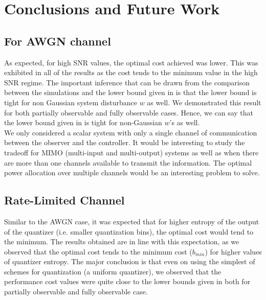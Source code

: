\documentclass[12pt]{caltech_thesis_finalreport}
\begin{document}
\chapter{Conclusions and Future Work}
\section{For AWGN channel}
As expected, for high SNR values, the optimal cost achieved was lower. This was exhibited in all of the results as the cost tends to the minimum value in the high SNR regime.  The important inference that can be drawn from the comparison between the simulations and the lower bound given in \cite{victoria} is that the lower bound is tight for non Gaussian system disturbance $w$ as well. We demonstrated this result for both partially observable and fully observable cases. Hence, we can say that the lower bound given in \cite{victoria} is tight for non-Gaussian $w$'s as well. \\
We only considered a scalar system with only a single channel of communication between the observer and the controller. It would be interesting to study the tradeoff for MIMO (multi-input and multi-output) systems as well as when there are more than one channels available to transmit the information. The optimal power allocation over multiple channels would be an interesting problem to solve. 

\section{Rate-Limited Channel}
Similar to the AWGN case, it was expected that for higher entropy of the output of the quantizer (i.e. smaller quantization bins), the optimal cost would tend to the minimum. The results obtained are in line with this expectation, as we observed that the optimal cost tends to the minimum cost ($b_{min}$) for higher values of quantizer entropy. The major conclusion is that even on using the simplest of schemes for quantization (a uniform quantizer), we observed that the performance cost values were quite close to the lower bounds given in \cite{victoria} both for partially observable and fully observable case. \\


\end{document}
